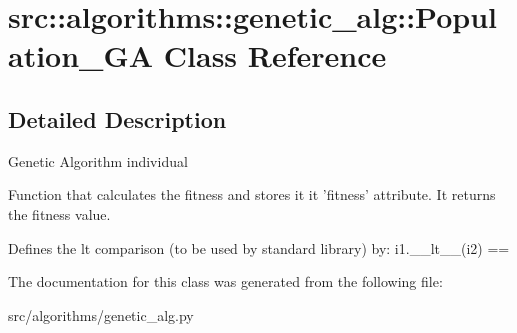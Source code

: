 \hypertarget{classsrc_1_1algorithms_1_1genetic__alg_1_1Population__GA}{
\section{src::algorithms::genetic\_\-alg::Population\_\-GA Class Reference}
\label{classsrc_1_1algorithms_1_1genetic__alg_1_1Population__GA}
}


\subsection{Detailed Description}
\begin{DoxyVerb}
    Genetic Algorithm individual
    \end{DoxyVerb}
 \begin{DoxyVerb}
    Function that calculates the fitness and stores it it 'fitness' attribute.
    It returns the fitness value.
    \end{DoxyVerb}
 \begin{DoxyVerb}
    Defines the lt comparison (to be used by standard library) by:
        i1.__lt__(i2) == 
    \end{DoxyVerb}
 

The documentation for this class was generated from the following file:\begin{DoxyCompactItemize}
\item 
src/algorithms/genetic\_\-alg.py\end{DoxyCompactItemize}
